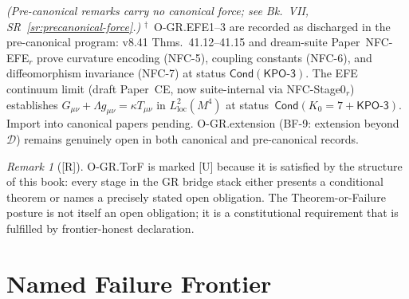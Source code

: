 \documentclass[12pt,oneside]{amsbook}
\theoremstyle{plain}
\theoremstyle{definition}
\theoremstyle{remark}
\newtheorem{remark}[theorem]{Remark}
\newcommand{\status}[1]{\textup{[#1]}}
\begin{document}
\noindent\small{\textit{(Pre-canonical remarks carry no canonical force;
see Bk.~VII, SR~\ref{sr:precanonical-force}.)} $^\dagger$~O-GR.EFE1--3 are recorded as discharged
in the pre-canonical program: v8.41 Thms.~41.12--41.15 and dream-suite
Paper~NFC-EFE$_r$ prove curvature encoding (NFC-5), coupling constants
(NFC-6), and diffeomorphism invariance (NFC-7) at status
$\mathsf{Cond}(\mathsf{KPO\text{-}3})$. The EFE continuum limit
(draft Paper~CE, now suite-internal via NFC-Stage0$_r$) establishes
$G_{\mu\nu} + \Lambda g_{\mu\nu} = \kappa T_{\mu\nu}$ in
$L^2_\mathrm{loc}(M^4)$ at status~$\mathsf{Cond}(K_0=7 +
\mathsf{KPO\text{-}3})$. Import into canonical papers pending.
O-GR.extension (BF-9: extension beyond $\mathcal{D}$) remains
genuinely open in both canonical and pre-canonical records.}
\normalsize

\medskip

\begin{remark}[\status{R}]
O-GR.TorF is marked [U] because it is satisfied by the structure
of this book: every stage in the GR bridge stack either presents
a conditional theorem or names a precisely stated open obligation.
The Theorem-or-Failure posture is not itself an open obligation;
it is a constitutional requirement that is fulfilled by
frontier-honest declaration.
\end{remark}

\section{Named Failure Frontier}
\label{sec:frontier}
\end{document}
